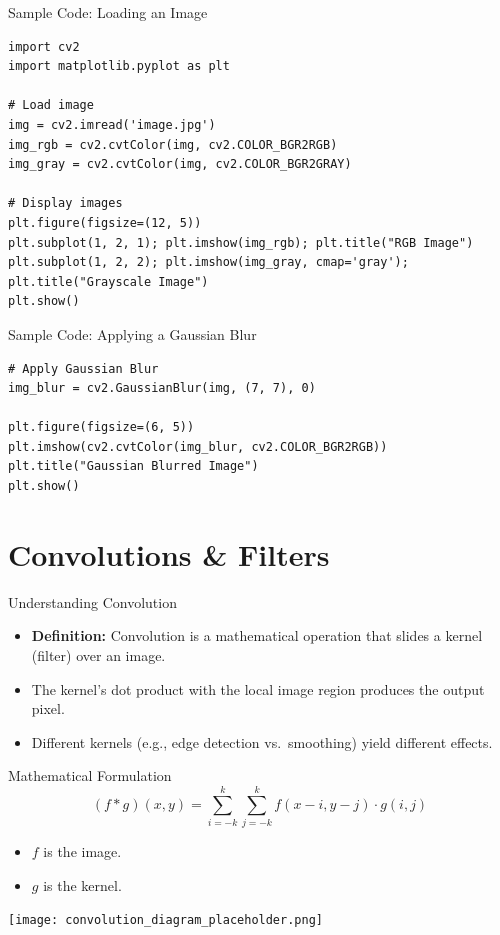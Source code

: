 \documentclass{beamer}
\begin{document}
\begin{frame}[fragile]{Sample Code: Loading an Image}
\lstset{language=Python, basicstyle=\ttfamily\footnotesize, breaklines=true}
\begin{lstlisting}
import cv2
import matplotlib.pyplot as plt

# Load image
img = cv2.imread('image.jpg')
img_rgb = cv2.cvtColor(img, cv2.COLOR_BGR2RGB)
img_gray = cv2.cvtColor(img, cv2.COLOR_BGR2GRAY)

# Display images
plt.figure(figsize=(12, 5))
plt.subplot(1, 2, 1); plt.imshow(img_rgb); plt.title("RGB Image")
plt.subplot(1, 2, 2); plt.imshow(img_gray, cmap='gray'); plt.title("Grayscale Image")
plt.show()
\end{lstlisting}
\end{frame}

\begin{frame}[fragile]{Sample Code: Applying a Gaussian Blur}
\lstset{language=Python, basicstyle=\ttfamily\footnotesize, breaklines=true}
\begin{lstlisting}
# Apply Gaussian Blur
img_blur = cv2.GaussianBlur(img, (7, 7), 0)

plt.figure(figsize=(6, 5))
plt.imshow(cv2.cvtColor(img_blur, cv2.COLOR_BGR2RGB))
plt.title("Gaussian Blurred Image")
plt.show()
\end{lstlisting}
\end{frame}

\section{Convolutions \& Filters}

\begin{frame}{Understanding Convolution}
  \begin{itemize}
    \item \textbf{Definition:} Convolution is a mathematical operation that slides a kernel (filter) over an image.
    \item The kernel's dot product with the local image region produces the output pixel.
    \item Different kernels (e.g., edge detection vs.\ smoothing) yield different effects.
  \end{itemize}
\end{frame}

\begin{frame}{Mathematical Formulation}
  \[
    (f * g)(x,y) = \sum_{i=-k}^{k} \sum_{j=-k}^{k} f(x-i, y-j) \cdot g(i,j)
  \]
  \begin{itemize}
    \item \( f \) is the image.
    \item \( g \) is the kernel.
  \end{itemize}
  \begin{center}
    \texttt{[image: convolution\_diagram\_placeholder.png]} %
  \end{center}
\end{frame}
\end{document}
